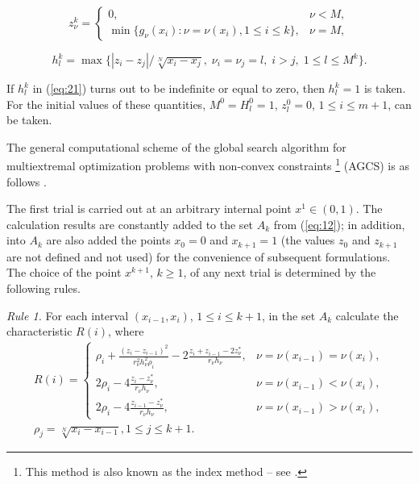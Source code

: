 \documentclass[smallextended]{svjour3}       %
\begin{document}
\begin{equation}\label{eq:20}
z^k_\nu = 
 \begin{cases}
   0, & \nu < M, \\
   \min{\{g_\nu(x_i):\nu=\nu(x_i), 1\leq i \leq k \}}, & \nu = M,
 \end{cases}
\end{equation}

\begin{equation}\label{eq:21}
h^k_l=\max{\{|z_i-z_j|/\sqrt[N]{x_i-x_j},\; \nu_i=\nu_j=l,\; i>j, \;1\leq l\leq M^k\}}.
\end{equation}

If $h_l^k$ in (\ref{eq:21}) turns out to be indefinite or equal to zero, then $h_l^k=1$ is taken. For the initial values of these quantities, $M^0 = H_l^0=1$, $z_l^0=0$, $1 \leq i \leq m+1$, can be taken.

The general computational scheme of the global search algorithm for multiextremal optimization problems with non-convex constraints \footnote{This method is also known as the index method -- see \cite{c18}.} (AGCS) is as follows \cite{c18}.

The first trial is carried out at an arbitrary internal point $x^1\in (0,1)$. The calculation results are constantly added to the set $A_k$ from (\ref{eq:12}); in addition, into $A_k$ are also added the points $x_0=0$ and $x_{k+1}=1$ (the values $z_0$ and $z_{k+1}$ are not defined and not used) for the convenience of subsequent formulations. The choice of the point $x^{k+1}$, $k\geq 1$, of any next trial is determined by the following rules.

\textit{Rule 1.} For each interval $(x_{i-1},x_i)$, $1 \leq i \leq k+1$, in the set $A_k$ calculate the characteristic $R(i)$, where
\begin{equation}\label{eq:22}
\begin{matrix}
R(i) = 
 \begin{cases}
   \rho_i + \frac{(z_i-z_{i-1})^2}{r^2_\nu h^2_\nu \rho_i} - 2 \frac{z_i+z_{i-1}-2z^*_\nu}{r_\nu h_\nu}, & \nu=\nu(x_{i-1})=\nu(x_i), \\
   2 \rho_i - 4\frac{z_i-z^*_\nu}{r_\nu h_\nu}, & \nu=\nu(x_{i-1})<\nu(x_i), \\
2 \rho_i - 4\frac{z_{i-1}-z^*_\nu}{r_\nu h_\nu}, & \nu=\nu(x_{i-1})>\nu(x_i), 
 \end{cases} \\
\rho_j = \sqrt[N]{x_i-x_{i-1}}, 1\leq j\leq k+1.
\end{matrix}
\end{equation}
\end{document}
